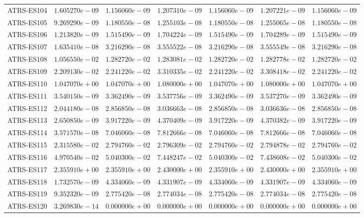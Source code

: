 \begin{longtable}{lrrrrrr}
ATRS-ES104 & $1.605270e-09$ & $1.156060e-09$ & $1.207310e-09$ & $1.156060e-09$ & $1.207221e-09$ & $1.156060e-09$ \\
ATRS-ES105 & $9.269290e-09$ & $1.180550e-08$ & $1.255103e-08$ & $1.180550e-08$ & $1.255065e-08$ & $1.180550e-08$ \\
ATRS-ES106 & $1.213820e-09$ & $1.515490e-09$ & $1.704224e-09$ & $1.515490e-09$ & $1.704289e-09$ & $1.515490e-09$ \\
ATRS-ES107 & $1.635410e-08$ & $3.216290e-08$ & $3.555522e-08$ & $3.216290e-08$ & $3.555549e-08$ & $3.216290e-08$ \\
ATRS-ES108 & $1.056550e-02$ & $1.282720e-02$ & $1.283081e-02$ & $1.282720e-02$ & $1.282778e-02$ & $1.282720e-02$ \\
ATRS-ES109 & $2.209130e-02$ & $2.241220e-02$ & $3.310335e-02$ & $2.241220e-02$ & $3.308418e-02$ & $2.241220e-02$ \\
ATRS-ES110 & $1.047070e+00$ & $1.047070e+00$ & $1.080000e+00$ & $1.047070e+00$ & $1.080000e+00$ & $1.047070e+00$ \\
ATRS-ES111 & $3.540150e-09$ & $3.362490e-09$ & $3.537756e-09$ & $3.362490e-09$ & $3.537270e-09$ & $3.362490e-09$ \\
ATRS-ES112 & $2.044180e-08$ & $2.856850e-08$ & $3.036663e-08$ & $2.856850e-08$ & $3.036636e-08$ & $2.856850e-08$ \\
ATRS-ES113 & $2.650850e-09$ & $3.917220e-09$ & $4.370409e-09$ & $3.917220e-09$ & $4.370382e-09$ & $3.917220e-09$ \\
ATRS-ES114 & $3.571570e-08$ & $7.046060e-08$ & $7.812666e-08$ & $7.046060e-08$ & $7.812666e-08$ & $7.046060e-08$ \\
ATRS-ES115 & $2.315580e-02$ & $2.794760e-02$ & $2.796309e-02$ & $2.794760e-02$ & $2.794878e-02$ & $2.794760e-02$ \\
ATRS-ES116 & $4.970540e-02$ & $5.040300e-02$ & $7.448247e-02$ & $5.040300e-02$ & $7.438608e-02$ & $5.040300e-02$ \\
ATRS-ES117 & $2.355910e+00$ & $2.355910e+00$ & $2.430000e+00$ & $2.355910e+00$ & $2.430000e+00$ & $2.355910e+00$ \\
ATRS-ES118 & $1.732570e-09$ & $4.334060e-09$ & $4.331907e-09$ & $4.334060e-09$ & $4.331907e-09$ & $4.334060e-09$ \\
ATRS-ES119 & $9.352320e-09$ & $2.775420e-08$ & $2.774034e-08$ & $2.775420e-08$ & $2.774034e-08$ & $2.775420e-08$ \\
ATRS-ES120 & $3.269830e-14$ & $0.000000e+00$ & $0.000000e+00$ & $0.000000e+00$ & $0.000000e+00$ & $0.000000e+00$ \\

\end{longtable}
